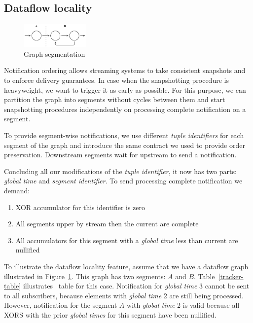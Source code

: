 \subsection{Dataflow locality}

\begin{figure}[htbp]
  \centering
  \includegraphics[width=0.3\textwidth]{pics/graph-segments.pdf}
  \caption{Graph segmentation}
  \label{fig:tracker-acker-comparison}
\end{figure}

Notification ordering allows streaming systems to take consistent snapshots and to enforce delivery guarantees. In case when the snapshotting procedure is heavyweight, we want to trigger it as early as possible. For this purpose, we can partition the graph into segments without cycles between them and start snapshotting procedures independently on processing complete notification on a segment.

To provide segment-wise notifications, we use different \textit{tuple identifiers} for each segment of the graph and introduce the same contract we used to provide order preservation. Downstream segments wait for upstream to send a notification. 

Concluding all our modifications of the \textit{tuple identifier}, it now has two parts: \textit{global time} and \textit{segment identifier}. To send processing complete notification we demand:
\begin{enumerate}
    \item XOR accumulator for this identifier is zero
    \item All segments upper by stream then the current are complete
    \item All accumulators for this segment with a  \textit{global time} less than current are nullified
\end{enumerate}

To illustrate the dataflow locality feature, assume that we have a dataflow graph illustrated in Figure~\ref{fig:tracker-acker-comparison}. This graph has two segments: $A$ and $B$. Table~\ref{tracker-table} illustrates \tracker\ table for this case. Notification for \textit{global time} 3 cannot be sent to all subscribers, because elements with \textit{global time} 2 are still being processed. However, notification for the segment $A$ with \textit{global time} 2 is valid because all XORS with the prior \textit{global times} for this segment have been nullified.

